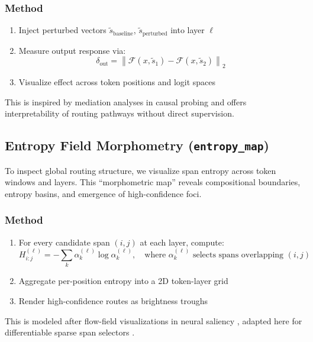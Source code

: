 \subsubsection*{Method}

\begin{enumerate}[leftmargin=1.5em]
  \item Inject perturbed vectors \( \tilde{s}_\text{baseline} \), \( \tilde{s}_\text{perturbed} \) into layer \( \ell \)
  \item Measure output response via:
  \begin{equation}
    \delta_{\text{out}} = \left\| \mathcal{F}(x, \tilde{s}_1) - \mathcal{F}(x, \tilde{s}_2) \right\|_2
    \label{eq:controller_effect}
  \end{equation}
  \item Visualize effect across token positions and logit spaces
\end{enumerate}

This is inspired by mediation analyses in causal probing \cite{vig2020investigating, belinkov2019analyzing} and offers interpretability of routing pathways without direct supervision.

\subsection{Entropy Field Morphometry (\texttt{entropy\_map})}
\label{sec:vis-entropy}

To inspect global routing structure, we visualize span entropy across token windows and layers. This “morphometric map” reveals compositional boundaries, entropy basins, and emergence of high-confidence foci.

\subsubsection*{Method}

\begin{enumerate}[leftmargin=1.5em]
  \item For every candidate span \( (i,j) \) at each layer, compute:
  \begin{equation}
    H_{i:j}^{(\ell)} = -\sum_k \alpha_k^{(\ell)} \log \alpha_k^{(\ell)}, \quad \text{where } \alpha_k^{(\ell)} \text{ selects spans overlapping } (i, j)
    \label{eq:entropy_local}
  \end{equation}
  \item Aggregate per-position entropy into a 2D token-layer grid
  \item Render high-confidence routes as brightness troughs
\end{enumerate}

This is modeled after flow-field visualizations in neural saliency \cite{olah2018building}, adapted here for differentiable sparse span selectors \cite{pereyra2017regularizing, liu2024structured}.
